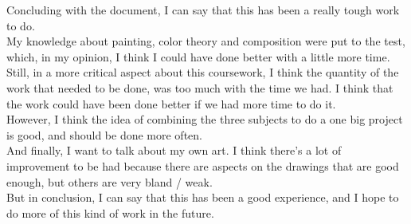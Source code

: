\documentclass{cup-pan}
\begin{document}
Concluding with the document, I can say that this has been a really tough work to do.\\ 

My knowledge about painting, color theory and composition were put to the test, which, in my opinion, I think I could have done better with a little more time.\\

Still, in a more critical aspect about this coursework, I think the quantity of the work that needed to be done, was too much with the time we had. I think that the work could have been done better if we had more time to do it.\\

However, I think the idea of combining the three subjects to do a one big project is good, and should be done more often.\\

And finally, I want to talk about my own art. I think there's a lot of improvement to be had because there are aspects on the drawings that are good enough, but others are very bland / weak.\\

But in conclusion, I can say that this has been a good experience, and I hope to do more of this kind of work in the future.\\

\newpage
\end{document}
